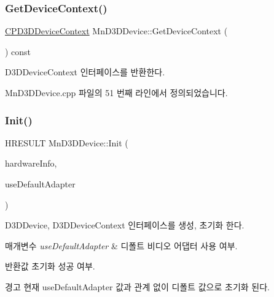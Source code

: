 \subsubsection{\texorpdfstring{Get\+Device\+Context()}{GetDeviceContext()}}
{\footnotesize\ttfamily \hyperlink{namespace_m_n_l_aab3aabb6c9360e44ddc8b0bb563c2107}{C\+P\+D3\+D\+Device\+Context} Mn\+D3\+D\+Device\+::\+Get\+Device\+Context (\begin{DoxyParamCaption}{ }\end{DoxyParamCaption}) const}



D3\+D\+Device\+Context 인터페이스를 반환한다. 



Mn\+D3\+D\+Device.\+cpp 파일의 51 번째 라인에서 정의되었습니다.

\mbox{\label{class_m_n_l_1_1_mn_d3_d_device_aada86462878af0f620871fc4b9836edc}} 
\subsubsection{\texorpdfstring{Init()}{Init()}}
{\footnotesize\ttfamily H\+R\+E\+S\+U\+LT Mn\+D3\+D\+Device\+::\+Init (\begin{DoxyParamCaption}\item[{const \hyperlink{class_m_n_l_1_1_mn_hardware}{Mn\+Hardware} \&}]{hardware\+Info,  }\item[{bool}]{use\+Default\+Adapter }\end{DoxyParamCaption})}



D3\+D\+Device, D3\+D\+Device\+Context 인터페이스를 생성, 초기화 한다. 


\begin{DoxyParams}{매개변수}
{\em use\+Default\+Adapter} & 디폴트 비디오 어댑터 사용 여부. \\
\hline
\end{DoxyParams}
\begin{DoxyReturn}{반환값}
초기화 성공 여부. 
\end{DoxyReturn}
\begin{DoxyWarning}{경고}
현재 use\+Default\+Adapter 값과 관계 없이 디폴트 값으로 초기화 된다. 
\end{DoxyWarning}


